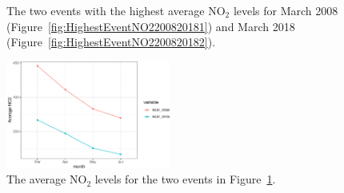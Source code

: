 \documentclass[a4paper,11pt]{article}
\begin{document}
\begin{figure}[!htb]
	\centering
 \caption{The two events with the highest average $\text{NO}_2$ levels for March 2008 (Figure~\ref{fig:HighestEventNO2200820181}) and March 2018 (Figure~\ref{fig:HighestEventNO2200820182}).}
 \label{fig:HighestEventNO220082018}
\end{figure}

\begin{figure}[!htb]
    \centering
    \includegraphics[width=0.48\textwidth]{./Graphics/Highest_Event_NO2_2008_2018.pdf}
     \caption{The average $\text{NO}_2$ levels for the two events in Figure~\ref{fig:HighestEventNO220082018}.}
    \label{fig:HighestEventNO2200820183}
\end{figure}
\end{document}
